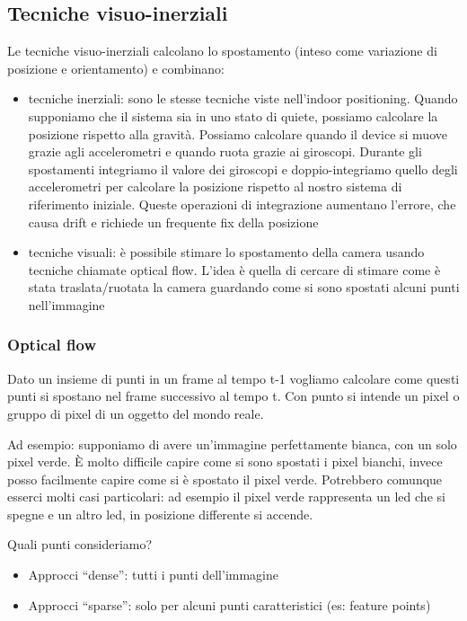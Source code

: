 \subsection{Tecniche visuo-inerziali}
Le tecniche visuo-inerziali calcolano lo spostamento (inteso come variazione di posizione e orientamento) e combinano:
\begin{itemize}
    \item tecniche inerziali: sono le stesse tecniche viste nell'indoor positioning. Quando supponiamo che il sistema sia in uno stato di quiete, possiamo calcolare la posizione rispetto alla gravità. Possiamo calcolare quando il device si muove grazie agli accelerometri e quando ruota grazie ai giroscopi.
    Durante gli spostamenti integriamo il valore dei giroscopi e doppio-integriamo quello degli accelerometri per calcolare la posizione rispetto al nostro sistema di riferimento iniziale.
    Queste operazioni di integrazione aumentano l'errore, che causa drift e richiede un frequente fix della posizione
    \item tecniche visuali: è possibile stimare lo spostamento della camera usando tecniche chiamate optical flow. L'idea è quella di cercare di stimare come è stata traslata/ruotata la camera guardando come si sono spostati alcuni punti nell'immagine
\end{itemize}

\subsubsection{Optical flow}
Dato un insieme di punti in un frame al tempo t-1 vogliamo calcolare come questi punti si spostano nel frame successivo al tempo t.
Con punto si intende un pixel o gruppo di pixel di un oggetto del mondo reale.

Ad esempio: supponiamo di avere un'immagine perfettamente bianca, con un solo pixel verde. È molto difficile capire come si sono spostati i pixel bianchi, invece posso facilmente capire come si è spostato il pixel verde. Potrebbero comunque esserci molti casi particolari: ad esempio il pixel verde rappresenta un led che si spegne e un altro led, in posizione differente si accende.

Quali punti consideriamo?
\begin{itemize}
    \item Approcci “dense”: tutti i punti dell'immagine
    \item Approcci “sparse”: solo per alcuni punti caratteristici (es: feature points)
\end{itemize}

